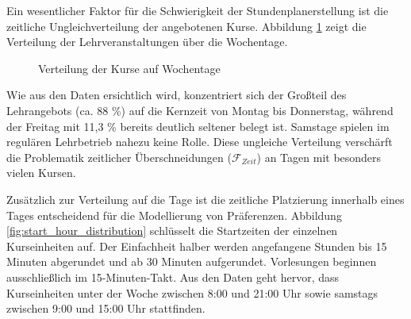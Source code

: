\newpage
Ein wesentlicher Faktor für die Schwierigkeit der Stundenplanerstellung ist die zeitliche Ungleichverteilung der angebotenen Kurse. Abbildung \ref{fig:descriptive_analysis_offering_weekday} zeigt die Verteilung der Lehrveranstaltungen über die Wochentage.


\begin{figure}[H]
  \centering
  \caption{Verteilung der Kurse auf Wochentage}
  \label{fig:descriptive_analysis_offering_weekday}
\end{figure}


Wie aus den Daten ersichtlich wird, konzentriert sich der Großteil des Lehrangebots (ca. 88 \%) auf die Kernzeit von Montag bis Donnerstag, während der Freitag mit 11{,}3 \% bereits deutlich seltener belegt ist. Samstage spielen im regulären Lehrbetrieb nahezu keine Rolle. Diese ungleiche Verteilung verschärft die Problematik zeitlicher Überschneidungen ($\mathcal{F}_{Zeit}$) an Tagen mit besonders vielen Kursen.



\newpage

Zusätzlich zur Verteilung auf die Tage ist die zeitliche Platzierung innerhalb eines Tages entscheidend für die Modellierung von Präferenzen.
Abbildung \ref{fig:start_hour_distribution} schlüsselt die Startzeiten der einzelnen Kurseinheiten auf. Der Einfachheit halber werden angefangene Stunden bis 15 Minuten abgerundet und ab 30 Minuten aufgerundet. Vorlesungen beginnen ausschließlich im 15-Minuten-Takt.
Aus den Daten geht hervor, dass Kurseinheiten unter der Woche zwischen 8:00 und 21:00 Uhr sowie samstags zwischen 9:00 und 15:00 Uhr stattfinden.

